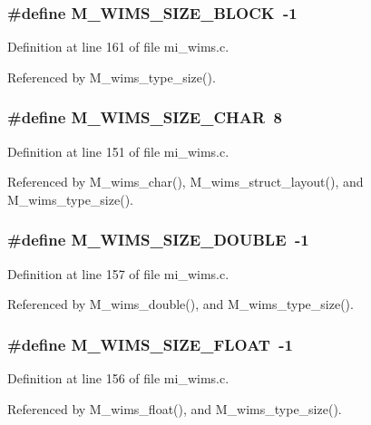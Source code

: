 \subsubsection{\setlength{\rightskip}{0pt plus 5cm}\#define M\_\-WIMS\_\-SIZE\_\-BLOCK~-1}\label{mi__wims_8c_ca0ee342385e52791a63efa23deccd71}




Definition at line 161 of file mi\_\-wims.c.

Referenced by M\_\-wims\_\-type\_\-size().
\subsubsection{\setlength{\rightskip}{0pt plus 5cm}\#define M\_\-WIMS\_\-SIZE\_\-CHAR~8}\label{mi__wims_8c_b69fc61a84e79b1a0b5becb0f0154546}




Definition at line 151 of file mi\_\-wims.c.

Referenced by M\_\-wims\_\-char(), M\_\-wims\_\-struct\_\-layout(), and M\_\-wims\_\-type\_\-size().
\subsubsection{\setlength{\rightskip}{0pt plus 5cm}\#define M\_\-WIMS\_\-SIZE\_\-DOUBLE~-1}\label{mi__wims_8c_449cf8c59d50a0da679eb534e0f7f31a}




Definition at line 157 of file mi\_\-wims.c.

Referenced by M\_\-wims\_\-double(), and M\_\-wims\_\-type\_\-size().
\subsubsection{\setlength{\rightskip}{0pt plus 5cm}\#define M\_\-WIMS\_\-SIZE\_\-FLOAT~-1}\label{mi__wims_8c_d8f19fcb2e0fa99167d71432d0d2f868}




Definition at line 156 of file mi\_\-wims.c.

Referenced by M\_\-wims\_\-float(), and M\_\-wims\_\-type\_\-size().
